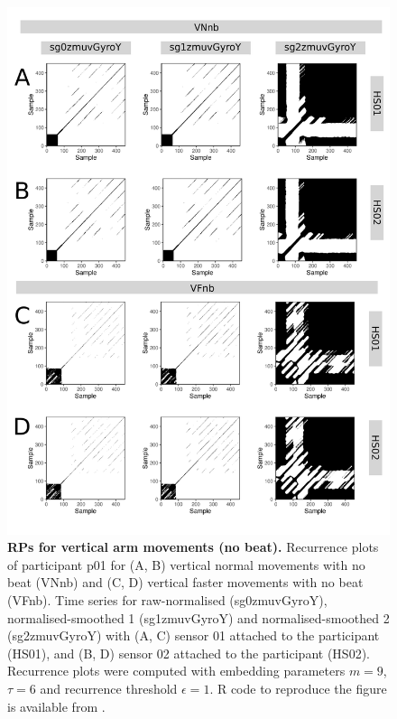 \begin{figure}[!h]
\centering
\includegraphics[height=0.8\textheight]{rps_Vnb_w500}
\caption{
	{\bf RPs for vertical arm movements (no beat).}	
	Recurrence plots of participant p01 for 
	(A, B) vertical normal movements with no beat (VNnb) and
	(C, D) vertical faster movements with no beat (VFnb).
	Time series for raw-normalised (sg0zmuvGyroY), 
	normalised-smoothed 1 (sg1zmuvGyroY) and 
	normalised-smoothed 2 (sg2zmuvGyroY) with
	(A, C) sensor 01 attached to the participant (HS01), and
	(B, D) sensor 02 attached to the participant (HS02).
	Recurrence plots were computed with 
	embedding parameters $m=9$, $\tau=6$ and 
	recurrence threshold $\epsilon=1$.
	R code to reproduce the figure is available from \cite{hwum2018}.
        }
    \label{fig:rps_Vnb_w500}
\end{figure}

